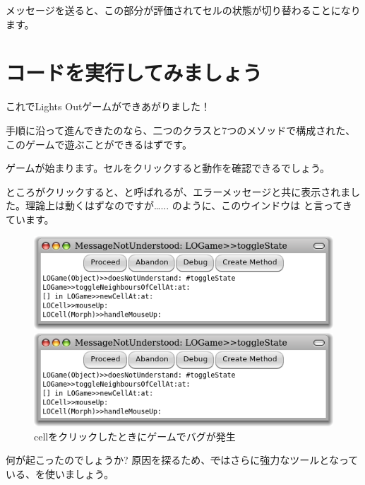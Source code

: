\documentclass[a4paper,10pt,twoside]{book}
\begin{document}

\noindent
{}メッセージを送ると、この部分が評価されてセルの状態が切り替わることになります。

\section{コードを実行してみましょう}

これでLights Outゲームができあがりました！

手順に沿って進んできたのなら、二つのクラスと7つのメソッドで構成された、このゲームで遊ぶことができるはずです。


ゲームが始まります。セルをクリックすると動作を確認できるでしょう。

ところがクリックすると、と呼ばれるが、エラーメッセージと共に表示されました。理論上は動くはずなのですが\ldots{}... のように、このウインドウは と言ってきています。

\begin{figure}[ht]
\ifluluelse
	{\centerline{\includegraphics[width=\textwidth]{Error}}}
	{\centerline{\includegraphics[scale=0.7]{Error}}}
\caption{cellをクリックしたときにゲームでバグが発生
}
\end{figure}

\noindent
何が起こったのでしょうか? 原因を探るため、\st ではさらに強力なツールとなっている、を使いましょう。
\end{document}
